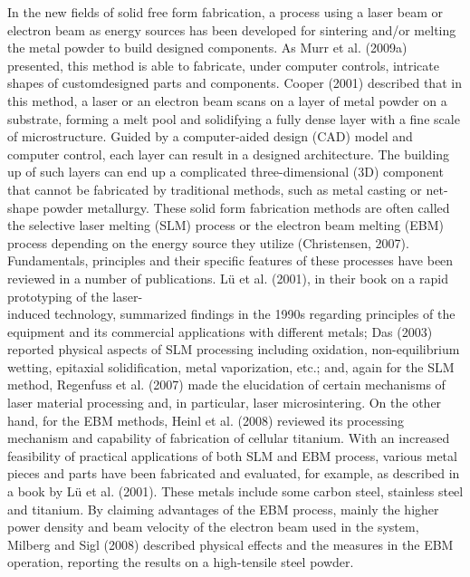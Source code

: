 \documentclass[10pt]{article}
\begin{document}
In the new fields of solid free form fabrication, a process using a laser beam or electron beam as energy sources has been developed for sintering and/or melting the metal powder to build designed components. As Murr et al. (2009a) presented, this method is able to fabricate, under computer controls, intricate shapes of customdesigned parts and components. Cooper (2001) described that in this method, a laser or an electron beam scans on a layer of metal powder on a substrate, forming a melt pool and solidifying a fully dense layer with a fine scale of microstructure. Guided by a computer-aided design (CAD) model and computer control, each layer can result in a designed architecture. The building up of such layers can end up a complicated three-dimensional (3D) component that cannot be fabricated by traditional methods, such as metal casting or net-shape powder metallurgy. These solid form fabrication methods are often called the selective laser melting (SLM) process or the electron beam melting (EBM) process depending on the energy source they utilize (Christensen, 2007). Fundamentals, principles and their specific features of these processes have been reviewed in a number of publications. Lü et al. (2001), in their book on a rapid prototyping of the laser-\\
induced technology, summarized findings in the 1990s regarding principles of the equipment and its commercial applications with different metals; Das (2003) reported physical aspects of SLM processing including oxidation, non-equilibrium wetting, epitaxial solidification, metal vaporization, etc.; and, again for the SLM method, Regenfuss et al. (2007) made the elucidation of certain mechanisms of laser material processing and, in particular, laser microsintering. On the other hand, for the EBM methods, Heinl et al. (2008) reviewed its processing mechanism and capability of fabrication of cellular titanium. With an increased feasibility of practical applications of both SLM and EBM process, various metal pieces and parts have been fabricated and evaluated, for example, as described in a book by Lü et al. (2001). These metals include some carbon steel, stainless steel and titanium. By claiming advantages of the EBM process, mainly the higher power density and beam velocity of the electron beam used in the system, Milberg and Sigl (2008) described physical effects and the measures in the EBM operation, reporting the results on a high-tensile steel powder.
\end{document}

